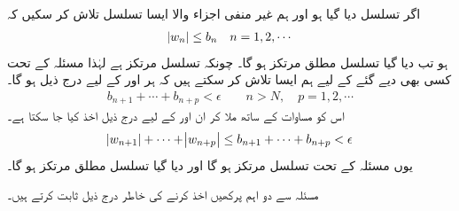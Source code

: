 \quad {}\\
اگر تسلسل  دیا گیا ہو اور ہم غیر منفی اجزاء والا ایسا تسلسل  تلاش کر سکیں کہ
\begin{align}\label{مساوات_ترتیب_جانچ_مقابلہ_الف}
\abs{w_n}\le b_n\quad n=1,2,\cdots
\end{align}
ہو تب دیا گیا تسلسل مطلق مرتکز ہو گا۔
\quad
چونکہ تسلسل  مرتکز ہے  لہٰذا مسئلہ  کے تحت کسی بھی دیے گئے  کے لیے ہم ایسا  تلاش کر سکتے ہیں کہ ہر  اور  کے لیے درج ذیل ہو گا۔
\begin{align*}
b_{n+1}+\cdots+b_{n+p}<\epsilon \quad \quad n>N,\quad p=1,2,\cdots
\end{align*}
اس کو مساوات  کے ساتھ ملا کر ان  اور  کے لیے درج ذیل اخذ کیا جا سکتا ہے۔
\begin{align*}
\abs{w_{n+1}}+\cdots+\abs{w_{n+p}}\le b_{n+1}+\cdots+b_{n+p}<\epsilon
\end{align*}
یوں مسئلہ  کے تحت تسلسل  مرتکز ہو گا اور دیا گیا تسلسل مطلق مرتکز ہو گا۔

مسئلہ  سے دو اہم پرکھیں  اخذ کرنے کی خاطر درج ذیل ثابت کرتے ہیں۔

